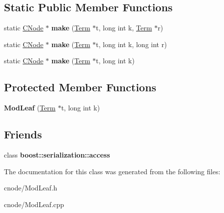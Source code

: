 \subsection*{\-Static \-Public \-Member \-Functions}
\begin{DoxyCompactItemize}
\item 
\hypertarget{classModLeaf_a9687353c013510b29fef1b126a9d0185}{static \hyperlink{classCNode}{\-C\-Node} $\ast$ {\bfseries make} (\hyperlink{classTerm}{\-Term} $\ast$t, long int k, \hyperlink{classTerm}{\-Term} $\ast$r)}\label{classModLeaf_a9687353c013510b29fef1b126a9d0185}

\item 
\hypertarget{classModLeaf_a91e39eacd261b1f463a45081dede7d41}{static \hyperlink{classCNode}{\-C\-Node} $\ast$ {\bfseries make} (\hyperlink{classTerm}{\-Term} $\ast$t, long int k, long int r)}\label{classModLeaf_a91e39eacd261b1f463a45081dede7d41}

\item 
\hypertarget{classModLeaf_abf7788797fec8d1b195f046e4ffa0ee0}{static \hyperlink{classCNode}{\-C\-Node} $\ast$ {\bfseries make} (\hyperlink{classTerm}{\-Term} $\ast$t, long int k)}\label{classModLeaf_abf7788797fec8d1b195f046e4ffa0ee0}

\end{DoxyCompactItemize}
\subsection*{\-Protected \-Member \-Functions}
\begin{DoxyCompactItemize}
\item 
\hypertarget{classModLeaf_a463bf691a2eed88a4993794f1a5a7564}{{\bfseries \-Mod\-Leaf} (\hyperlink{classTerm}{\-Term} $\ast$t, long int k)}\label{classModLeaf_a463bf691a2eed88a4993794f1a5a7564}

\end{DoxyCompactItemize}
\subsection*{\-Friends}
\begin{DoxyCompactItemize}
\item 
\hypertarget{classModLeaf_ac98d07dd8f7b70e16ccb9a01abf56b9c}{class {\bfseries boost\-::serialization\-::access}}\label{classModLeaf_ac98d07dd8f7b70e16ccb9a01abf56b9c}

\end{DoxyCompactItemize}


\-The documentation for this class was generated from the following files\-:\begin{DoxyCompactItemize}
\item 
cnode/\-Mod\-Leaf.\-h\item 
cnode/\-Mod\-Leaf.\-cpp\end{DoxyCompactItemize}
